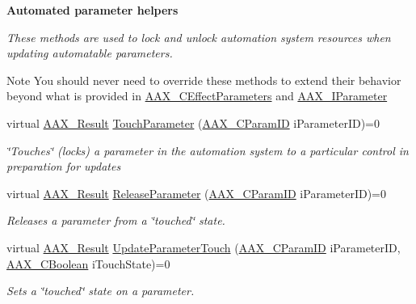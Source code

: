 \begin{Indent}{\bf Automated parameter helpers}\par
{\em These methods are used to lock and unlock automation system \textquotesingle{}resources\textquotesingle{} when updating automatable parameters.

\begin{DoxyNote}{Note}
You should never need to override these methods to extend their behavior beyond what is provided in \hyperlink{a00018}{A\+A\+X\+\_\+\+C\+Effect\+Parameters} and \hyperlink{a00108}{A\+A\+X\+\_\+\+I\+Parameter} 
\end{DoxyNote}
}\begin{DoxyCompactItemize}
\item 
virtual \hyperlink{a00149_a4d8f69a697df7f70c3a8e9b8ee130d2f}{A\+A\+X\+\_\+\+Result} \hyperlink{a00061_ae82e80cbfd9cb837f8101a85f06856ba}{Touch\+Parameter} (\hyperlink{a00149_a1440c756fe5cb158b78193b2fc1780d1}{A\+A\+X\+\_\+\+C\+Param\+I\+D} i\+Parameter\+I\+D)=0
\begin{DoxyCompactList}\small\item\em \char`\"{}\+Touches\char`\"{} (locks) a parameter in the automation system to a particular control in preparation for updates \end{DoxyCompactList}\item 
virtual \hyperlink{a00149_a4d8f69a697df7f70c3a8e9b8ee130d2f}{A\+A\+X\+\_\+\+Result} \hyperlink{a00061_a2caf1b7b8e2dad62cf96f144479dee60}{Release\+Parameter} (\hyperlink{a00149_a1440c756fe5cb158b78193b2fc1780d1}{A\+A\+X\+\_\+\+C\+Param\+I\+D} i\+Parameter\+I\+D)=0
\begin{DoxyCompactList}\small\item\em Releases a parameter from a \char`\"{}touched\char`\"{} state. \end{DoxyCompactList}\item 
virtual \hyperlink{a00149_a4d8f69a697df7f70c3a8e9b8ee130d2f}{A\+A\+X\+\_\+\+Result} \hyperlink{a00061_a93483f44315bdf3adf60bf5bf773fbb8}{Update\+Parameter\+Touch} (\hyperlink{a00149_a1440c756fe5cb158b78193b2fc1780d1}{A\+A\+X\+\_\+\+C\+Param\+I\+D} i\+Parameter\+I\+D, \hyperlink{a00149_aa216506530f1d19a2965931ced2b274b}{A\+A\+X\+\_\+\+C\+Boolean} i\+Touch\+State)=0
\begin{DoxyCompactList}\small\item\em Sets a \char`\"{}touched\char`\"{} state on a parameter. \end{DoxyCompactList}\end{DoxyCompactItemize}
\end{Indent}
